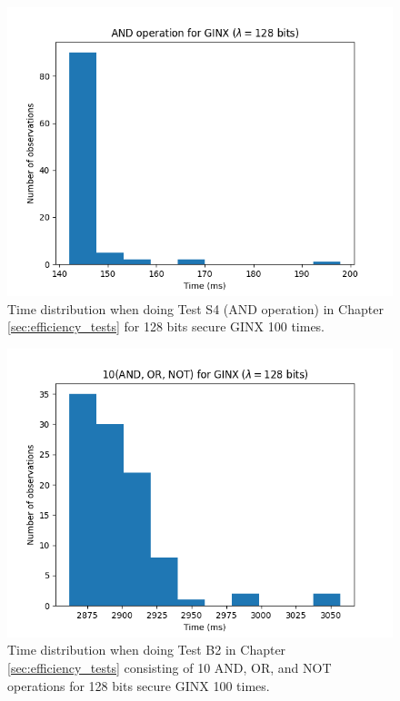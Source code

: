 \begin{figure}[ht]
    \centering
    \includegraphics[width=0.8\linewidth]{data/figures/GINX_STD128_AND_operation.png}
    \caption{Time distribution when doing Test S4 (AND operation) in Chapter \ref{sec:efficiency_tests} for 128 bits secure GINX 100 times.}
    \label{fig:distr_ginx128_and}
\end{figure}

\begin{figure}[ht]
    \centering
    \includegraphics[width=0.8\linewidth]{data/figures/GINX_STD128_10AND_OR_NOT.png}
    \caption{Time distribution when doing Test B2 in Chapter \ref{sec:efficiency_tests} consisting of 10 AND, OR, and NOT operations for 128 bits secure GINX 100 times.}
    \label{fig:distr_ginx128_10}
\end{figure}

